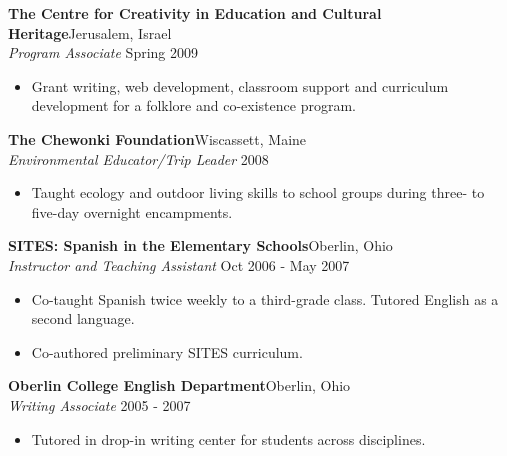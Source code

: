 \documentclass[margin,centered]{resume}
\newcommand{\employerName}[1]{\textbf{#1}}
\newcommand{\jobPosition}[1]{\textit{#1}}
\begin{document}
\begin{resume}
	{\employerName{The Centre for Creativity in Education and Cultural Heritage}}\hfill Jerusalem, Israel\\
    \jobPosition{Program Associate} \hfill Spring 2009 \\
    \begin{itemize}  \itemsep -2pt
        \item Grant writing, web development, classroom support and curriculum development for a folklore and co-existence program. 
    \end{itemize}
    \vspace{1mm}
	
	{\employerName{The Chewonki Foundation}}\hfill Wiscassett, Maine\\
    \jobPosition{Environmental Educator/Trip Leader} \hfill 2008 \\
    \begin{itemize}  \itemsep -2pt
        \item Taught ecology and outdoor living skills to school groups during three- to five-day overnight encampments. 
    \end{itemize}
    \vspace{1mm}
	
	{\employerName{SITES: Spanish in the Elementary Schools}}\hfill Oberlin, Ohio\\
    \jobPosition{Instructor and Teaching Assistant} \hfill Oct 2006 - May 2007 \\
    \begin{itemize}  \itemsep -2pt
        \item Co-taught Spanish twice weekly to a third-grade class. Tutored English as a second language. 
	    \item Co-authored preliminary SITES curriculum.
    \end{itemize}
    \vspace{1mm}
	
	{\employerName{Oberlin College English Department}}\hfill Oberlin, Ohio\\
    \jobPosition{Writing Associate} \hfill 2005 - 2007 \\
    \begin{itemize}  \itemsep -2pt
	    \item Tutored in drop-in writing center for students across disciplines.
    \end{itemize}
    \vspace{1mm}
	

\end{resume}
\end{document}
